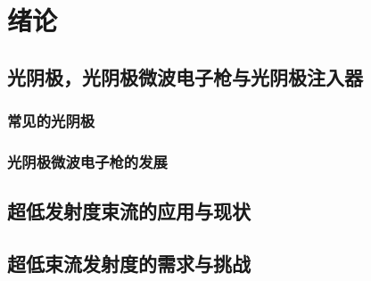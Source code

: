 \chapter{绪论}
\label{chap:intro}

\section{光阴极，光阴极微波电子枪与光阴极注入器}

\subsection{常见的光阴极}

\subsection{光阴极微波电子枪的发展}

\section{超低发射度束流的应用与现状}

\section{超低束流发射度的需求与挑战}
